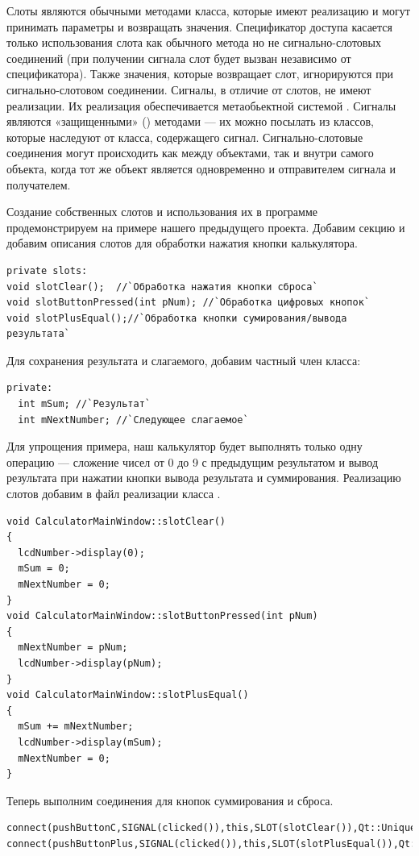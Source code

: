 Слоты являются обычными методами класса, которые имеют реализацию и могут  принимать параметры и возвращать
значения. Спецификатор доступа касается только использования слота как обычного метода но не сигнально-слотовых
соединений (при получении сигнала слот будет вызван независимо от спецификатора). Также значения, которые возвращает
слот, игнорируются при сигнально-слотовом соединении. Сигналы, в отличие от слотов, не имеют реализации. Их реализация
обеспечивается метаобьектной системой . Сигналы являются «защищенными» () методами --- их можно
посылать из классов, которые наследуют от класса, содержащего сигнал. Сигнально-слотовые соединения могут происходить
как между объектами, так и внутри самого объекта, когда тот же объект является одновременно и отправителем сигнала и
получателем.

Создание собственных слотов и использования их  в программе продемонстрируем на примере нашего
предыдущего проекта. Добавим секцию  и добавим описания слотов для обработки нажатия кнопки
калькулятора.
\begin{lstlisting}
private slots:
void slotClear();  //`Обработка нажатия кнопки сброса`
void slotButtonPressed(int pNum); //`Обработка цифровых кнопок`
void slotPlusEqual();//`Обработка кнопки сумирования/вывода результата`
\end{lstlisting}

Для сохранения результата и слагаемого, добавим частный член класса:
\begin{lstlisting}
private:
  int mSum; //`Результат`
  int mNextNumber; //`Следующее слагаемое`
\end{lstlisting}

Для упрощения примера, наш калькулятор будет выполнять только одну операцию --- сложение чисел от 0 до 9 с предыдущим
результатом и вывод результата при нажатии кнопки вывода результата и суммирования. Реализацию слотов добавим в файл
реализации класса .
\begin{lstlisting}
void CalculatorMainWindow::slotClear()
{
  lcdNumber->display(0);
  mSum = 0;
  mNextNumber = 0;
}
void CalculatorMainWindow::slotButtonPressed(int pNum)
{
  mNextNumber = pNum;
  lcdNumber->display(pNum);
}
void CalculatorMainWindow::slotPlusEqual()
{
  mSum += mNextNumber;
  lcdNumber->display(mSum);
  mNextNumber = 0;
}
\end{lstlisting}

Теперь выполним соединения для кнопок суммирования и сброса.
\begin{lstlisting}
connect(pushButtonC,SIGNAL(clicked()),this,SLOT(slotClear()),Qt::UniqueConnection);
connect(pushButtonPlus,SIGNAL(clicked()),this,SLOT(slotPlusEqual()),Qt::UniqueConnection);
\end{lstlisting}

